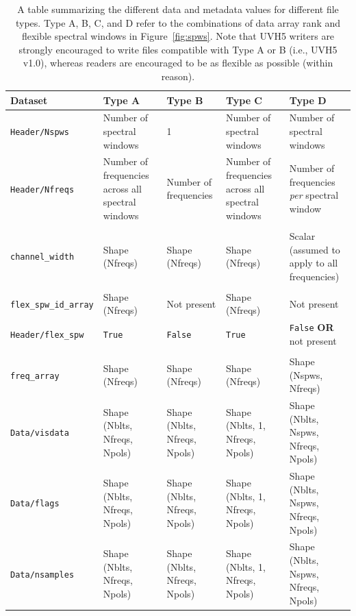 \documentclass[11pt, oneside]{article}
\begin{document}
\begin{table}[t]
  \scriptsize
  \begin{center}
    \begin{tabular}{ m{8em} | m{10em} | m{10em} | m{10em} | m{10em}}
      \textbf{Dataset} & \textbf{Type A} & \textbf{Type B} & \textbf{Type C} & \textbf{Type D} \\ \hline\hline
      \texttt{Header/Nspws} & Number of spectral windows & 1 & Number of spectral windows & Number of spectral windows \\ \hline
      \texttt{Header/Nfreqs} & Number of frequencies across all spectral windows & Number of frequencies & Number of frequencies across all spectral windows & Number of frequencies \textit{per} spectral window \\ \hline
      \makecell[cl]{\texttt{Header/}\\\texttt{channel\_width}} & Shape (Nfreqs) & Shape (Nfreqs) & Shape (Nfreqs) & Scalar (assumed to apply to all frequencies) \\[1.75em] \hline
      \makecell[cl]{\texttt{Header/}\\\texttt{flex\_spw\_id\_array}} & Shape (Nfreqs) & Not present & Shape (Nfreqs) & Not present \\[1.75em] \hline
      \texttt{Header/flex\_spw} & \texttt{True} & \texttt{False} & \texttt{True} & \texttt{False} \textbf{OR} not present \\[1.75em] \hline
      \makecell[cl]{\texttt{Header/}\\\texttt{freq\_array}} & Shape (Nfreqs) & Shape (Nfreqs) & Shape (Nfreqs) & Shape (Nspws, Nfreqs) \\[1.75em] \hline
      \texttt{Data/visdata} & Shape (Nblts, Nfreqs, Npols) & Shape (Nblts, Nfreqs, Npols) & Shape (Nblts, 1, Nfreqs, Npols) & Shape (Nblts, Nspws, Nfreqs, Npols) \\[1.75em] \hline
      \texttt{Data/flags} & Shape (Nblts, Nfreqs, Npols) & Shape (Nblts, Nfreqs, Npols) & Shape (Nblts, 1, Nfreqs, Npols) & Shape (Nblts, Nspws, Nfreqs, Npols) \\[1.75em] \hline
      \texttt{Data/nsamples} & Shape (Nblts, Nfreqs, Npols) & Shape (Nblts, Nfreqs, Npols) & Shape (Nblts, 1, Nfreqs, Npols) & Shape (Nblts, Nspws, Nfreqs, Npols) \\
    \end{tabular}
  \end{center}
  \caption{A table summarizing the different data and metadata values for
    different file types. Type A, B, C, and D refer to the combinations of data
    array rank and flexible spectral windows in Figure~\ref{fig:spws}. Note that
    UVH5 writers are strongly encouraged to write files compatible with Type A
    or B (i.e., UVH5 v1.0), whereas readers are encouraged to be as flexible as
    possible (within reason).}
  \label{table:spw}
\end{table}
\end{document}
